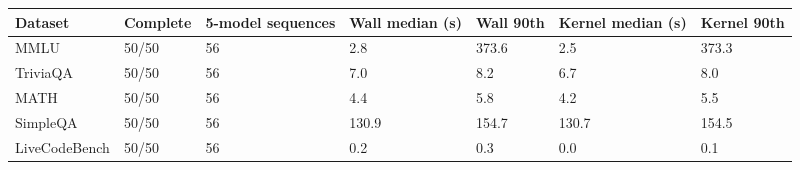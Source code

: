 \begin{tabular}{lllllll}
\toprule
Dataset & Complete & 5-model sequences & Wall median (s) & Wall 90th & Kernel median (s) & Kernel 90th \\
\midrule
MMLU & 50/50 & 56 & 2.8 & 373.6 & 2.5 & 373.3 \\
TriviaQA & 50/50 & 56 & 7.0 & 8.2 & 6.7 & 8.0 \\
MATH & 50/50 & 56 & 4.4 & 5.8 & 4.2 & 5.5 \\
SimpleQA & 50/50 & 56 & 130.9 & 154.7 & 130.7 & 154.5 \\
LiveCodeBench & 50/50 & 56 & 0.2 & 0.3 & 0.0 & 0.1 \\
\bottomrule
\end{tabular}
